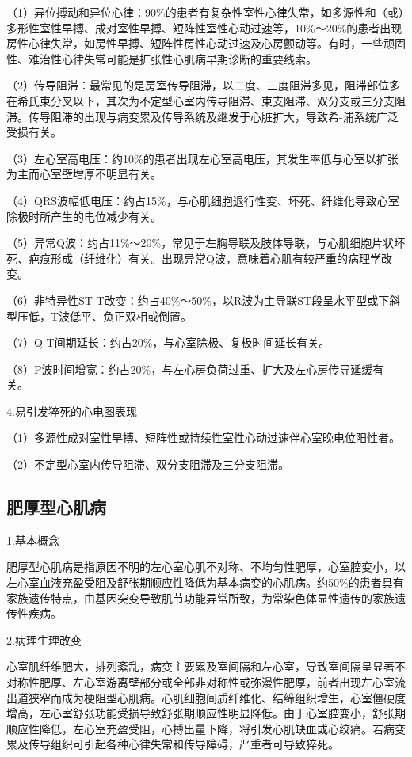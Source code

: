 （1）异位搏动和异位心律：90\%的患者有复杂性室性心律失常，如多源性和（或）多形性室性早搏、成对室性早搏、短阵性室性心动过速等，10\%～20\%的患者出现房性心律失常，如房性早搏、短阵性房性心动过速及心房颤动等。有时，一些顽固性、难治性心律失常可能是扩张性心肌病早期诊断的重要线索。

（2）传导阻滞：最常见的是房室传导阻滞，以二度、三度阻滞多见，阻滞部位多在希氏束分叉以下，其次为不定型心室内传导阻滞、束支阻滞、双分支或三分支阻滞。传导阻滞的出现与病变累及传导系统及继发于心脏扩大，导致希-浦系统广泛受损有关。

（3）左心室高电压：约10\%的患者出现左心室高电压，其发生率低与心室以扩张为主而心室壁增厚不明显有关。

（4）QRS波幅低电压：约占15\%，与心肌细胞退行性变、坏死、纤维化导致心室除极时所产生的电位减少有关。

（5）异常Q波：约占11\%～20\%，常见于左胸导联及肢体导联，与心肌细胞片状坏死、疤痕形成（纤维化）有关。出现异常Q波，意味着心肌有较严重的病理学改变。

（6）非特异性ST-T改变：约占40\%～50\%，以R波为主导联ST段呈水平型或下斜型压低，T波低平、负正双相或倒置。

（7）Q-T间期延长：约占20\%，与心室除极、复极时间延长有关。

（8）P波时间增宽：约占20\%，与左心房负荷过重、扩大及左心房传导延缓有关。

4.易引发猝死的心电图表现

（1）多源性成对室性早搏、短阵性或持续性室性心动过速伴心室晚电位阳性者。

（2）不定型心室内传导阻滞、双分支阻滞及三分支阻滞。

\protect\hypertarget{text00051.htmlux5cux23subid616}{}{}

\subsection{肥厚型心肌病}

1.基本概念

肥厚型心肌病是指原因不明的左心室心肌不对称、不均匀性肥厚，心室腔变小，以左心室血液充盈受阻及舒张期顺应性降低为基本病变的心肌病。约50\%的患者具有家族遗传特点，由基因突变导致肌节功能异常所致，为常染色体显性遗传的家族遗传性疾病。

2.病理生理改变

心室肌纤维肥大，排列紊乱，病变主要累及室间隔和左心室，导致室间隔呈显著不对称性肥厚、左心室游离壁部分或全部非对称性或弥漫性肥厚，前者出现左心室流出道狭窄而成为梗阻型心肌病。心肌细胞间质纤维化、结缔组织增生，心室僵硬度增高，左心室舒张功能受损导致舒张期顺应性明显降低。由于心室腔变小，舒张期顺应性降低，左心室充盈受阻，心搏出量下降，将引发心肌缺血或心绞痛。若病变累及传导组织可引起各种心律失常和传导障碍，严重者可导致猝死。

